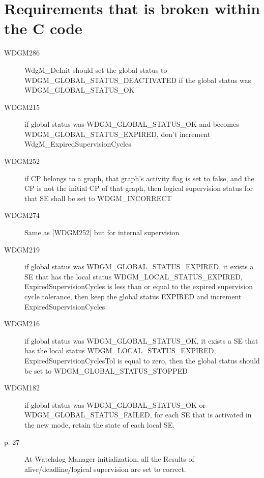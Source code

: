 \documentclass[11pt,a4paper]{article}
\begin{document}
\section{Requirements that is broken within the C code}
\begin{description}
  \item[WDGM286] \parbox[t]{0.8\linewidth}{WdgM\_DeInit should set the global
      status to WDGM\_GLOBAL\_STATUS\_DEACTIVATED if the global status was
    WDGM\_GLOBAL\_STATUS\_OK}
  \item[WDGM215] \parbox[t]{0.8\linewidth}{if global status was
      WDGM\_GLOBAL\_STATUS\_OK and becomes WDGM\_GLOBAL\_STATUS\_EXPIRED, don't
      increment WdgM\_ExpiredSupervisionCycles}
  \item[WDGM252] \parbox[t]{0.8\linewidth}{if CP belongs to a graph, that
      graph's activity flag is set to false, and the CP is not the initial CP of
      that graph, then logical supervision status for that SE shall be set to
      WDGM\_INCORRECT}
  \item[WDGM274] \parbox[t]{0.8\linewidth}{Same as [WDGM252] but for internal
      supervision}
  \item[WDGM219] \parbox[t]{0.8\linewidth}{if global status was
      WDGM\_GLOBAL\_STATUS\_EXPIRED, it exists a SE that has the local status
      WDGM\_LOCAL\_STATUS\_EXPIRED, ExpiredSupervisionCycles is less than or
      equal to the expired supervision cycle tolerance, then keep the global
      status EXPIRED and increment ExpiredSupervisionCycles}
  \item[WDGM216] \parbox[t]{0.8\linewidth}{if global status was
      WDGM\_GLOBAL\_STATUS\_OK, it exists a SE that has the local status
      WDGM\_LOCAL\_STATUS\_EXPIRED, ExpiredSupervisionCyclesTol is equal to
      zero, then the global status should be set to
      WDGM\_GLOBAL\_STATUS\_STOPPED}
  \item[WDGM182] \parbox[t]{0.8\linewidth}{if global status was WDGM\_GLOBAL\_STATUS\_OK or
      WDGM\_GLOBAL\_STATUS\_FAILED, for each SE that is activated in the new mode,
      retain the state of each local SE.}
  \item[p. 27] \parbox[t]{0.8\linewidth}{At Watchdog Manager initialization, all
      the Results of alive/deadline/logical supervision are set to correct.}
\end{description}
\end{document}
